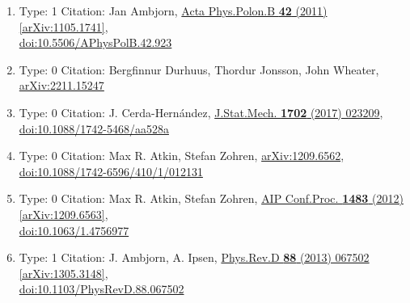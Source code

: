 \documentclass[a4paper,10pt]{article}
\begin{document}
\begin{enumerate}
\begin{enumerate}
  \item Type: 1 Citation: Jan Ambjorn, \href{https://www.doi.org/10.5506/APhysPolB.42.923}{Acta Phys.Polon.B {\bf 42} (2011) }  \href{https://arxiv.org/abs/1105.1741}{[arXiv:1105.1741]},\\\href{https://www.doi.org/10.5506/APhysPolB.42.923}{doi:10.5506/APhysPolB.42.923}
  \item Type: 0 Citation: Bergfinnur Durhuus, Thordur Jonsson, John Wheater, \href{https://arxiv.org/abs/2211.15247}{arXiv:2211.15247}
  \item Type: 0 Citation: J. Cerda-Hernández, \href{https://www.doi.org/10.1088/1742-5468/aa528a}{J.Stat.Mech. {\bf 1702} (2017) 023209},\\\href{https://www.doi.org/10.1088/1742-5468/aa528a}{doi:10.1088/1742-5468/aa528a}
  \item Type: 0 Citation: Max R. Atkin, Stefan Zohren, \href{https://arxiv.org/abs/1209.6562}{arXiv:1209.6562},\\\href{https://www.doi.org/10.1088/1742-6596/410/1/012131}{doi:10.1088/1742-6596/410/1/012131}
  \item Type: 0 Citation: Max R. Atkin, Stefan Zohren, \href{https://www.doi.org/10.1063/1.4756977}{AIP Conf.Proc. {\bf 1483} (2012) }  \href{https://arxiv.org/abs/1209.6563}{[arXiv:1209.6563]},\\\href{https://www.doi.org/10.1063/1.4756977}{doi:10.1063/1.4756977}
  \item Type: 1 Citation: J. Ambjorn, A. Ipsen, \href{https://www.doi.org/10.1103/PhysRevD.88.067502}{Phys.Rev.D {\bf 88} (2013) 067502}  \href{https://arxiv.org/abs/1305.3148}{[arXiv:1305.3148]},\\\href{https://www.doi.org/10.1103/PhysRevD.88.067502}{doi:10.1103/PhysRevD.88.067502}

\end{enumerate}
\end{enumerate}
\end{document}
